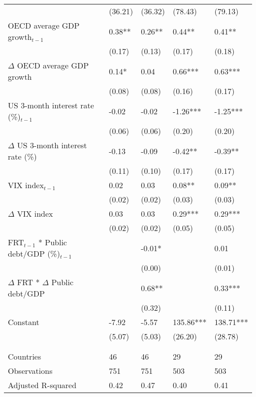 {\begin{tabular}{lp{2.5cm}p{2.5cm}p{2.5cm}p{2.5cm}}
   & (36.21) & (36.32) & (78.43) & (79.13) \\ 
  OECD average GDP growth$_{t-1}$ & 0.38** & 0.26** & 0.44** & 0.41** \\ 
   & (0.17) & (0.13) & (0.17) & (0.18) \\ 
  $\Delta$ OECD average GDP growth & 0.14* & 0.04 & 0.66*** & 0.63*** \\ 
   & (0.08) & (0.08) & (0.16) & (0.17) \\ 
  US 3-month interest rate (\%)$_{t-1}$ & -0.02 & -0.02 & -1.26*** & -1.25*** \\ 
   & (0.06) & (0.06) & (0.20) & (0.20) \\ 
  $\Delta$ US 3-month interest rate (\%) & -0.13 & -0.09 & -0.42** & -0.39** \\ 
   & (0.11) & (0.10) & (0.17) & (0.17) \\ 
  VIX index$_{t-1}$ & 0.02 & 0.03 & 0.08** & 0.09** \\ 
   & (0.02) & (0.02) & (0.03) & (0.03) \\ 
  $\Delta$ VIX index & 0.03 & 0.03 & 0.29*** & 0.29*** \\ 
   & (0.02) & (0.02) & (0.05) & (0.05) \\ 
  FRT$_{t-1}$ * Public debt/GDP (\%)$_{t-1}$ &  & -0.01* &  & 0.01 \\ 
   &  & (0.00) &  & (0.01) \\ 
  $\Delta$ FRT * $\Delta$ Public debt/GDP &  & 0.68** &  & 0.33*** \\ 
   &  & (0.32) &  & (0.11) \\ 
  Constant & -7.92 & -5.57 & 135.86*** & 138.71*** \\ 
   & (5.07) & (5.03) & (26.20) & (28.78) \\ 
   &  &  &  &  \\ 
   &  &  &  &  \\ 
  Countries & 46 & 46 & 29 & 29 \\ 
  Observations & 751 & 751 & 503 & 503 \\ 
  Adjusted R-squared & 0.42 & 0.47 & 0.40 & 0.41 \\ 
   \hline
\end{tabular}
}
